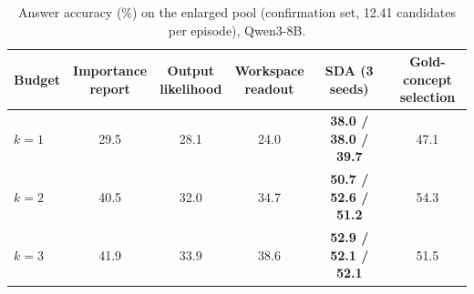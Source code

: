 \begin{table}[t]
\centering
\caption{Answer accuracy (\%) on the enlarged pool (confirmation set, 12.41 candidates per episode), Qwen3-8B. }
\label{tab:bigpool}
\small
\setlength{\tabcolsep}{3pt}
\begin{tabular}{lccccc}
\toprule
Budget & \shortstack{Importance\\report} & \shortstack{Output\\likelihood} & \shortstack{Workspace\\readout} & \textbf{SDA (3 seeds)} & \shortstack{Gold-concept\\selection} \\
\midrule
$k=1$ & 29.5 & 28.1 & 24.0 & \textbf{38.0 / 38.0 / 39.7} & 47.1 \\
$k=2$ & 40.5 & 32.0 & 34.7 & \textbf{50.7 / 52.6 / 51.2} & 54.3 \\
$k=3$ & 41.9 & 33.9 & 38.6 & \textbf{52.9 / 52.1 / 52.1} & 51.5 \\
\bottomrule
\end{tabular}

\end{table}
